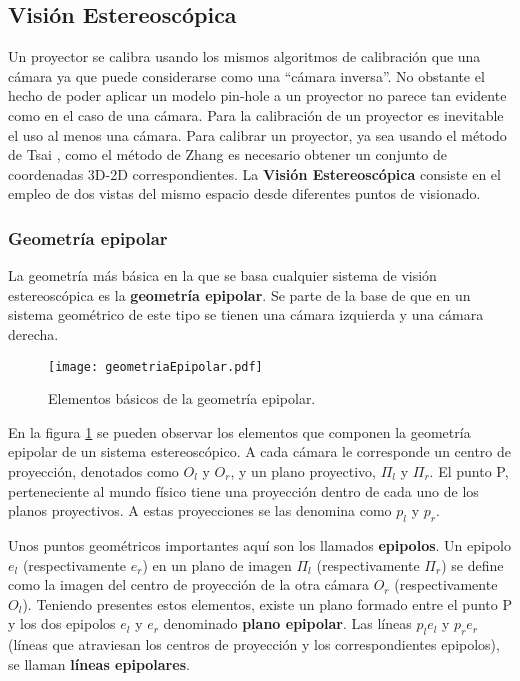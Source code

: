 %


\subsection{Visión Estereoscópica}

Un proyector se calibra usando los mismos algoritmos de calibración que una cámara ya que puede
considerarse como una ``cámara inversa''. No obstante el hecho de poder aplicar un modelo pin-hole
a un proyector no parece tan evidente como en el caso de una cámara. Para la calibración de un
proyector es inevitable el uso al menos una cámara. Para calibrar un proyector, ya sea usando el
método de Tsai \cite{Tsai}, como el método de Zhang \cite{Zhang99} es necesario obtener un conjunto
de coordenadas 3D-2D correspondientes. La \textbf{Visión Estereoscópica} consiste en el empleo de
dos vistas del mismo espacio desde diferentes puntos de visionado.

\subsubsection{Geometría epipolar}

La geometría más básica en la que se basa cualquier sistema de visión estereoscópica es la \textbf{geometría epipolar}. Se parte de la base de que en un sistema geométrico de este tipo se tienen una cámara izquierda y una cámara derecha.

\begin{figure}[h!]
  \centering
  \texttt{[image: geometriaEpipolar.pdf]}
  \caption{Elementos básicos de la geometría epipolar.}
  \label{fig:FIGgeomEpipolar}
\end{figure}


En la figura \ref{fig:FIGgeomEpipolar} se pueden observar los elementos que componen la geometría
epipolar de un sistema estereoscópico. A cada cámara le corresponde un centro de proyección,
denotados como $O_{l}$ y $O_{r}$, y un plano proyectivo, $\Pi_{l}$ y $\Pi_{r}$. El punto P,
perteneciente al mundo físico tiene una proyección dentro de cada uno de los planos proyectivos. A
estas proyecciones se las denomina como $p_{l}$ y $p_{r}$.


Unos puntos geométricos importantes aquí son los llamados \textbf{epipolos}. Un epipolo $e_l$ (res\-pectivamente $e_r$) en un plano de imagen $\Pi_{l}$ (respectivamente $\Pi_{r}$) se define como la imagen del centro de proyección de la otra cámara $O_{r}$ (respectivamente $O_{l}$). Teniendo presentes estos elementos, existe un plano formado entre el punto P y los dos epipolos $e_{l}$ y $e_{r}$ denominado \textbf{plano epipolar}. Las líneas $p_{l}e_{l}$ y $p_{r}e_{r}$ (líneas que atraviesan los centros de proyección y los correspondientes epipolos), se llaman \textbf{líneas epipolares}.

